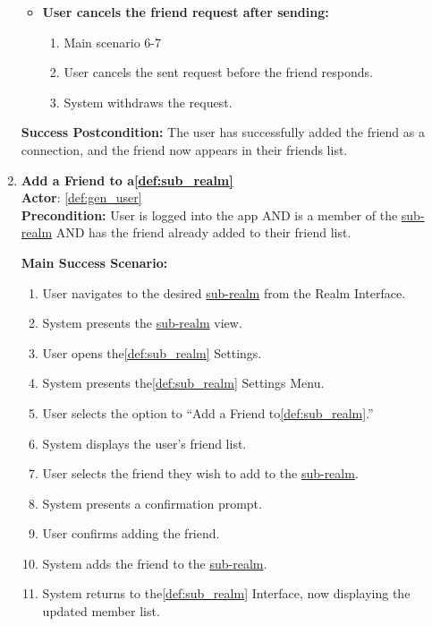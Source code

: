 \documentclass{article}
\begin{document}
\begin{enumerate}[label=\textbf{UC\arabic*}]
\begin{itemize}
              \item[{}] \textbf{User cancels the friend request after sending:}
                    \begin{enumerate}[label=\textbf{\arabic*.}]
                        \item Main scenario 6-7
                        \item User cancels the sent request before the friend responds.
                        \item System withdraws the request.
                    \end{enumerate}
          \end{itemize}

          \textbf{Success Postcondition:} The user has successfully added the friend as a connection, and the friend now appears in their friends list.

    \item \label{uc:21} \textbf{Add a Friend to a\ref{def:sub_realm}} \\
          \textbf{Actor}: \ref{def:gen_user} \\
          \textbf{Precondition:} User is logged into the app AND is a member of the \hyperref[def:sub_realm]{sub-realm} AND has the friend already added to their friend list.

          \textbf{Main Success Scenario:}
          \begin{enumerate}[label=\textbf{\arabic*.}]
              \item User navigates to the desired \hyperref[def:sub_realm]{sub-realm} from the Realm Interface.
              \item System presents the \hyperref[def:sub_realm]{sub-realm} view.
              \item User opens the\ref{def:sub_realm} Settings.
              \item System presents the\ref{def:sub_realm} Settings Menu.
              \item User selects the option to “Add a Friend to\ref{def:sub_realm}.”
              \item System displays the user's friend list.
              \item User selects the friend they wish to add to the \hyperref[def:sub_realm]{sub-realm}.
              \item System presents a confirmation prompt.
              \item User confirms adding the friend.
              \item System adds the friend to the \hyperref[def:sub_realm]{sub-realm}.
              \item System returns to the\ref{def:sub_realm} Interface, now displaying the updated member list.
          \end{enumerate}


\end{enumerate}
\end{document}
